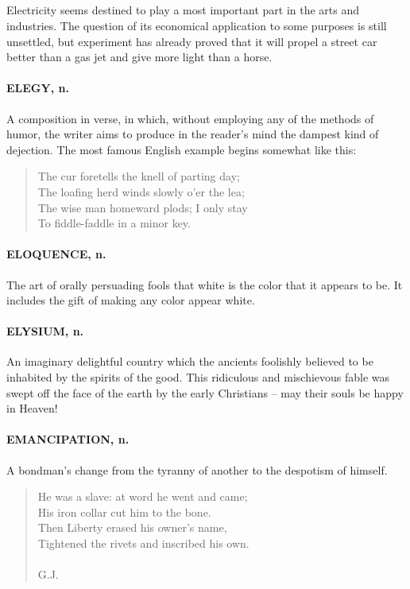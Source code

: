 \documentclass[11pt]{article}
\begin{document}
\subparagraph{}  Electricity seems destined to play a most important part in the
arts and industries.  The question of its economical application to
some purposes is still unsettled, but experiment has already proved
that it will propel a street car better than a gas jet and give more
light than a horse.

\paragraph{ELEGY, n.}  A composition in verse, in which, without employing any of
the methods of humor, the writer aims to produce in the reader's mind
the dampest kind of dejection.  The most famous English example begins
somewhat like this:

\begin{quote}   The cur foretells the knell of parting day; \\
      The loafing herd winds slowly o'er the lea; \\
  The wise man homeward plods; I only stay \\
      To fiddle-faddle in a minor key.  \end{quote}

\paragraph{ELOQUENCE, n.}  The art of orally persuading fools that white is the
color that it appears to be.  It includes the gift of making any color
appear white.

\paragraph{ELYSIUM, n.}  An imaginary delightful country which the ancients
foolishly believed to be inhabited by the spirits of the good.  This
ridiculous and mischievous fable was swept off the face of the earth
by the early Christians -- may their souls be happy in Heaven!

\paragraph{EMANCIPATION, n.}  A bondman's change from the tyranny of another to
the despotism of himself.

\begin{quote}   He was a slave:  at word he went and came; \\
      His iron collar cut him to the bone. \\
  Then Liberty erased his owner's name, \\
      Tightened the rivets and inscribed his own. \\
 \\
G.J. \end{quote}
\end{document}

